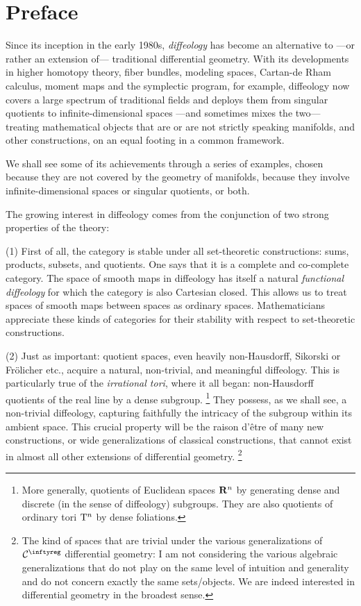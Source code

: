\chapter*{Preface}

Since its inception in the early 1980s,
\emph{diffeology} has become an alternative to
---or rather an extension of---
traditional differential geometry.
With its developments in higher homotopy theory,
fiber bundles,
modeling spaces,
Cartan-de Rham calculus,
moment maps and the symplectic program,
for example,
diffeology now covers a large spectrum of traditional fields and deploys them from singular quotients to infinite-dimensional spaces
---and sometimes mixes the two---
treating mathematical objects that are or are not strictly speaking manifolds,
and other constructions,
on an equal footing in a common framework.

We shall see some of its achievements through a series of examples,
chosen because they are not covered by the geometry of manifolds,
because they involve infinite-dimensional spaces or singular quotients,
or both.

The growing interest in diffeology comes from the conjunction of two strong properties of the theory:

(1) First of all,
the category  is stable under all set-theoretic constructions:
sums,
products,
subsets,
and quotients.
One says that it is a complete and co-complete category.
The space of smooth maps in diffeology has itself a natural \emph{functional diffeology} for which the category is also Cartesian closed.
This allows us to treat spaces of smooth maps between spaces as ordinary spaces.
Mathematicians appreciate these kinds of categories for their stability with respect to set-theoretic constructions.

(2) Just as important:
quotient spaces,
even heavily non-Hausdorff,
Sikorski or Frölicher \cite{KM97} etc.,
acquire a natural,
non-trivial,
and meaningful diffeology.
This is particularly true of the \emph{irrational tori},
where it all began:
non-Hausdorff quotients of the real line by a dense subgroup.%
\footnote{More generally,
quotients of Euclidean spaces $\mathbf{R}^n$ by generating dense and discrete (in the sense of diffeology) subgroups.
They are also quotients of ordinary tori $\mathrm{T}^n$ by dense foliations.}
They possess,
as we shall see,
a non-trivial diffeology,
capturing faithfully the intricacy of the subgroup within its ambient space.
This crucial property will be the raison d'être of many new constructions,
or wide generalizations of classical constructions,
that cannot exist in almost all other extensions of differential geometry.%
\footnote{The kind of spaces that are trivial under the various generalizations of $\Cinfty$ differential geometry:
I am not considering the various algebraic generalizations that do not play on the same level of intuition and generality and do not concern exactly the same sets/objects.
We are indeed interested in differential geometry in the broadest sense.}

